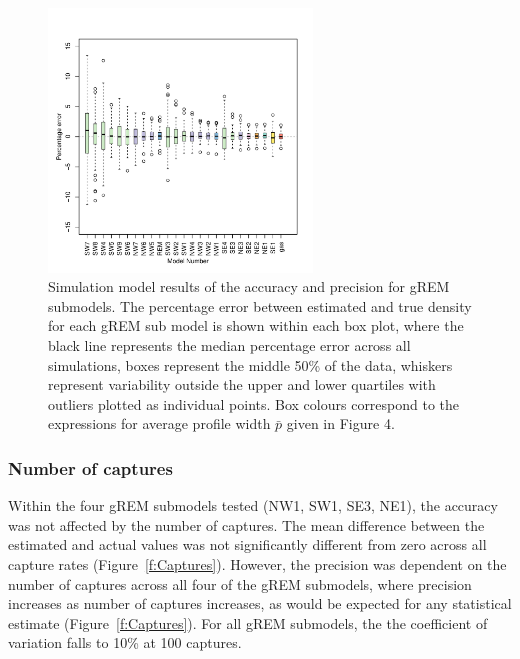 \documentclass[a4paper,10pt,reqno,oneside]{amsart}
\begin{document}
\begin{figure}[t]
	\centering
	\includegraphics[width=7cm]{imgs/AverageModelBias.pdf}
       	\caption{Simulation model results of the accuracy and precision for gREM submodels. The percentage error between estimated and true density for each gREM sub model is shown within each box plot, where the black line represents the median percentage error across all simulations, boxes represent the middle 50\% of the data, whiskers represent variability outside the upper and lower quartiles with outliers plotted as individual points. Box colours correspond to the expressions for average profile width $\bar{p}$ given in Figure 4.        
} 
	\label{f:ModelBias}
\end{figure}

\subsubsection*{Number of captures}

Within the four gREM submodels tested (NW1, SW1, SE3, NE1), the  accuracy was not affected by the number of captures. The mean difference between the estimated and actual values was not significantly different from zero across all capture rates (Figure~\ref{f:Captures}). However, the precision was dependent on the number of captures across all four of the gREM submodels, where precision increases as number of captures increases, as would be expected for any statistical estimate (Figure~\ref{f:Captures}). For all gREM submodels, the the coefficient of variation falls to 10\% at 100 captures. 
\end{document}
